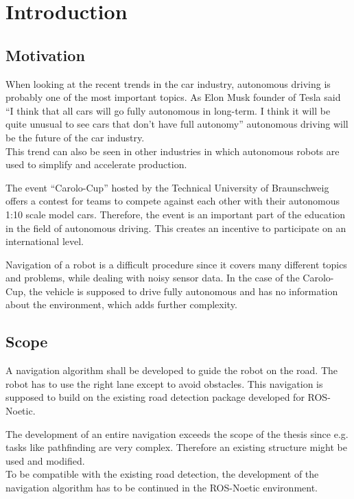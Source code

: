 \chapter{Introduction}
\label{introduction}


\section{Motivation}
When looking at the recent trends in the car industry, autonomous driving is probably one of the most important topics. As Elon Musk founder of Tesla said ``I think that all cars will go fully autonomous in long-term. I think it will be quite unusual to see cars that don’t have full autonomy'' autonomous driving will be the future of the car industry\cite{musk}.\\

This trend can also be seen in other industries in which autonomous robots are used to simplify and accelerate production. 

The event ``Carolo-Cup'' hosted by the Technical University of Braunschweig offers a contest for teams to compete against each other with their autonomous 1:10 scale model cars. Therefore, the event is an important part of the education in the field of autonomous driving. This creates an incentive to participate on an international level.

Navigation of a robot is a difficult procedure since it covers many different topics and problems, while dealing with noisy sensor data. In the case of the Carolo-Cup, the vehicle is supposed to drive fully autonomous and has no information about the environment, which adds further complexity.

\section{Scope}

A navigation algorithm shall be developed to guide the robot on the road. The robot has to use the right lane except to avoid obstacles. This navigation is supposed to build on the existing road detection package developed for ROS-Noetic.

The development of an entire navigation exceeds the scope of the thesis since e.g. tasks like pathfinding are very complex. Therefore an existing structure might be used and modified.\\

To be compatible with the existing road detection, the development of the navigation algorithm has to be continued in the ROS-Noetic environment.\\

